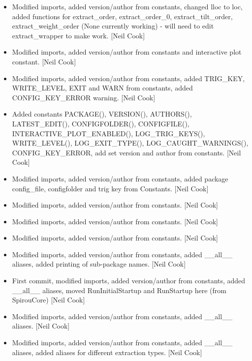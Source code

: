 \documentclass[a4paper,10pt,english]{report}
\begin{document}
\begin{itemize}
\item {} 
Modified imports, added version/author from constants, changed lloc to
loc, added functions for extract\_order, extract\_order\_0,
extract\_tilt\_order, extract\_weight\_order (None currently working) -
will need to edit extract\_wrapper to make work. {[}Neil Cook{]}

\item {} 
Modified imports, added version/author from constants and interactive
plot constant. {[}Neil Cook{]}

\item {} 
Modified imports, added version/author from constants, added TRIG\_KEY,
WRITE\_LEVEL, EXIT and WARN from constants, added CONFIG\_KEY\_ERROR
warning. {[}Neil Cook{]}

\item {} 
Added constants PACKAGE(), VERSION(), AUTHORS(), LATEST\_EDIT(),
CONFIGFOLDER(), CONFIGFILE(), INTERACTIVE\_PLOT\_ENABLED(),
LOG\_TRIG\_KEYS(), WRITE\_LEVEL(), LOG\_EXIT\_TYPE(),
LOG\_CAUGHT\_WARNINGS(), CONFIG\_KEY\_ERROR, add set version and author
from constants. {[}Neil Cook{]}

\item {} 
Modified imports, added version/author from constants, added package
config\_file, configfolder and trig key from Constants. {[}Neil Cook{]}

\item {} 
Modified imports, added version/author from constants. {[}Neil Cook{]}

\item {} 
Modified imports, added version/author from constants. {[}Neil Cook{]}

\item {} 
Modified imports, added version/author from constants. {[}Neil Cook{]}

\item {} 
Modified imports, added version/author from constants, added \_\_all\_\_
aliases, added printing of sub-package names. {[}Neil Cook{]}

\item {} 
First commit, modified imports, added version/author from constants,
added \_\_all\_\_ aliases, moved RunInitialStartup and RunStartup here
(from SpirouCore) {[}Neil Cook{]}

\item {} 
Modified imports, added version/author from constants, added \_\_all\_\_
aliases. {[}Neil Cook{]}

\item {} 
Modified imports, added version/author from constants, added \_\_all\_\_
aliases, added aliases for different extraction types. {[}Neil Cook{]}


\end{itemize}
\end{document}
